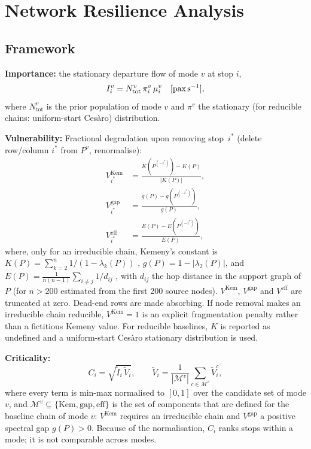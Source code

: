 \documentclass[12pt,a4paper]{article}
\theoremstyle{plain}
\theoremstyle{definition}
\theoremstyle{remark}
\begin{document}
\section{Network Resilience Analysis}
\label{sec:resilience}

\subsection{Framework}

\textbf{Importance:}  the stationary departure flow of mode $v$ at stop $i$,
\begin{equation}
  I^v_i = N^v_{\mathrm{tot}}\,\pi^v_i\,\mu^v_i
  \quad [\text{pax\,s}^{-1}],
  \label{eq:importance}
\end{equation}
where $N^v_{\mathrm{tot}}$ is the prior population of mode $v$ and $\pi^v$ the
stationary (for reducible chains: uniform-start Ces\`aro) distribution.

\textbf{Vulnerability:}  Fractional degradation upon removing stop~$i^*$
(delete row/column $i^*$ from $P^v$, renormalise):
\begin{align}
  V^{\mathrm{Kem}}_{i^*} &=
  \frac{K(P^{(-i^*)})-K(P)}{|K(P)|},\\
  V^{\mathrm{gap}}_{i^*} &= \frac{g(P)-g(P^{(-i^*)})}{g(P)},\\
  V^{\mathrm{eff}}_{i^*} &= \frac{E(P)-E(P^{(-i^*)})}{E(P)},
\end{align}
where, only for an irreducible chain, Kemeny's constant is
$K(P)=\sum_{k=2}^n 1/(1-\lambda_k(P))$
\citep{kemeny1976,levene2002}, $g(P)=1-|\lambda_2(P)|$, and
$E(P)=\frac{1}{n(n-1)}\sum_{i\ne j}1/d_{ij}$ \citep{latora2001}, with $d_{ij}$
the hop distance in the support graph of $P$ (for $n>200$ estimated from the
first 200 source nodes).  $V^{\mathrm{Kem}}$, $V^{\mathrm{gap}}$ and
$V^{\mathrm{eff}}$ are truncated at zero.
Dead-end rows are made absorbing.  If node removal makes an irreducible chain
reducible, $V^{\mathrm{Kem}}=1$ is an explicit fragmentation penalty rather
than a fictitious Kemeny value.  For reducible baselines, $K$ is reported as
undefined and a uniform-start Ces\`aro stationary distribution is used.

\textbf{Criticality:}
\begin{equation}
  C_i = \sqrt{\tilde{I}_i\,\tilde{V}_i},\qquad
  \tilde{V}_i = \frac{1}{|\mathcal{M}^v|}\sum_{c\in\mathcal{M}^v}\tilde{V}^{c}_i,
  \label{eq:criticality}
\end{equation}
where every term is min-max normalised to $[0,1]$ over the candidate set of
mode $v$, and $\mathcal{M}^v\subseteq\{\mathrm{Kem},\mathrm{gap},\mathrm{eff}\}$
is the set of components that are defined for the baseline chain of mode $v$:
$V^{\mathrm{Kem}}$ requires an irreducible chain and $V^{\mathrm{gap}}$ a
positive spectral gap $g(P)>0$.  Because of the normalisation, $C_i$ ranks
stops within a mode; it is not comparable across modes.
\end{document}
